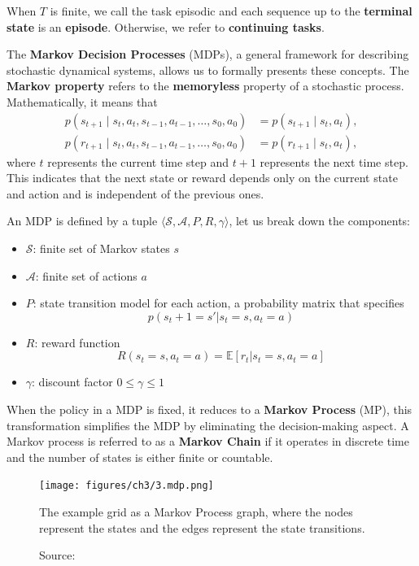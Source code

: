 When $T$ is finite, we call the task episodic and each sequence
up to the \textbf{terminal state} is an \textbf{episode}. Otherwise, we refer
to \textbf{continuing tasks}.

The \textbf{Markov Decision Processes} (MDPs),
a general framework for describing stochastic dynamical systems,
allows us to formally presents these concepts.
The \textbf{Markov property} refers to the \textbf{memoryless} property of a stochastic process. Mathematically, it means that
\begin{equation}
\begin{aligned}
p(s_{t+1} \mid s_t, a_t, s_{t-1}, a_{t-1}, \ldots, s_0, a_0) &= p(s_{t+1} \mid s_t, a_t), \\
p(r_{t+1} \mid s_t, a_t, s_{t-1}, a_{t-1}, \ldots, s_0, a_0) &= p(r_{t+1} \mid s_t, a_t),
\end{aligned}
\end{equation}
where \( t \) represents the current time step and \( t + 1 \) represents the next time step.
This indicates that the next state or reward depends only on the current
state and action and is independent of the previous ones.

\vspace{3cm}

An MDP is defined by a tuple \( \langle \mathcal{S}, \mathcal{A}, P, R, \gamma \rangle \),
let us break down the components:
\begin{itemize}
    \item \( \mathcal{S} \): finite set of Markov states $s$
    \item \( \mathcal{A} \): finite set of actions $a$
    \item \( P \): state transition model for each action,
    a probability matrix that specifies $$p(s_t+1 = s'|s_t=s, a_t=a)$$
    \item \( R \): reward function
    $$ R(s_t=s, a_t=a) = \mathbb{E} [r_t | s_t = s, a_t = a] $$
    \item \( \gamma \): discount factor $0 \leq \gamma \leq 1$
\end{itemize}

When the policy in a MDP is fixed, it reduces to a \textbf{Markov Process} (MP),
this transformation simplifies the MDP by eliminating the decision-making aspect. 
A Markov process is referred to as a \textbf{Markov Chain} if it operates in discrete
time and the number of states is either finite or countable.

\begin{figure}[h]
    \centering
    \texttt{[image: figures/ch3/3.mdp.png]}
    \caption{The example grid as a Markov Process graph, where the nodes
    represent the states and the edges represent the state transitions.}
    \vspace{-10px}
    \caption*{\scriptsize{Source: \cite{zhao2024RLBook}}}
    \label{fig:mdp}
\end{figure}


